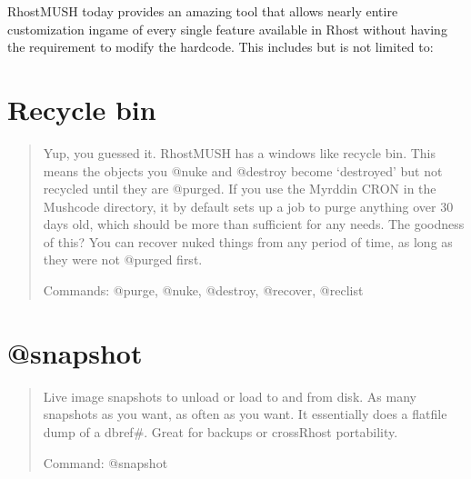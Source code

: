\documentclass[letterpaper,10pt,english]{sphinxmanual}
\begin{document}
\sphinxAtStartPar
RhostMUSH today provides an amazing tool that allows nearly entire
customization in\sphinxhyphen{}game of every single feature available in Rhost without
having the requirement to modify the hardcode.  This includes but is
not limited to:


\section{Recycle bin}
\label{\detokenize{features:recycle-bin}}\begin{quote}

\sphinxAtStartPar
Yup, you guessed it.  RhostMUSH has a windows like recycle bin.
This means the objects you @nuke and @destroy become ‘destroyed’
but not recycled until they are @purged.  If you use the Myrddin
CRON in the Mushcode directory, it by default sets up a job
to purge anything over 30 days old, which should be more than
sufficient for any needs.  The goodness of this?  You can recover
nuked things from any period of time, as long as they were not
@purged first.

\sphinxAtStartPar
Commands: @purge, @nuke, @destroy, @recover, @reclist
\end{quote}


\section{@snapshot}
\label{\detokenize{features:snapshot}}\begin{quote}

\sphinxAtStartPar
Live image snapshots to unload or load to and from
disk.  As many snapshots as you want, as often as you want.
It essentially does a flatfile dump of a dbref\#.  Great for
backups or cross\sphinxhyphen{}Rhost portability.

\sphinxAtStartPar
Command: @snapshot
\end{quote}
\end{document}

